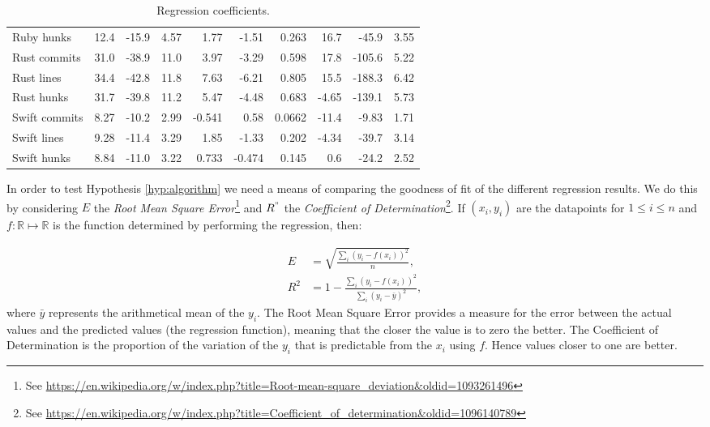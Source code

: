 \documentclass[10pt,journal,compsoc]{IEEEtran}
\begin{document}
\begin{table*}[t!]
\begin{center}
\begin{tabular}{l | *{3}{d{3.4}} | *{3}{d{3.4}} | d{4.5} *{2}{d{3.4}} }
Ruby hunks & 12.4 & -15.9 & 4.57 & 1.77 & -1.51 & 0.263 & 16.7 & -45.9 & 3.55 \\ \hdashline
Rust commits & 31.0 & -38.9 & 11.0 & 3.97 & -3.29 & 0.598 & 17.8 & -105.6 & 5.22 \\
Rust lines & 34.4 & -42.8 & 11.8 & 7.63 & -6.21 & 0.805 & 15.5 & -188.3 & 6.42 \\
Rust hunks & 31.7 & -39.8 & 11.2 & 5.47 & -4.48 & 0.683 & -4.65 & -139.1 & 5.73 \\ \hdashline
Swift commits & 8.27 & -10.2 & 2.99 & -0.541 & 0.58 & 0.0662 & -11.4 & -9.83 & 1.71 \\
Swift lines & 9.28 & -11.4 & 3.29 & 1.85 & -1.33 & 0.202 & -4.34 & -39.7 & 3.14 \\
Swift hunks & 8.84 & -11.0 & 3.22 & 0.733 & -0.474 & 0.145 & 0.6 & -24.2 & 2.52
\end{tabular}
\caption{\label{table:coefficients}Regression coefficients.}
\end{center}
\end{table*}

In order to test Hypothesis \ref{hyp:algorithm} we need a means of comparing the goodness of fit of the different regression results. We do this by considering $E$ the {\it Root Mean Square Error\/}\footnote{See \url{https://en.wikipedia.org/w/index.php?title=Root-mean-square_deviation&oldid=1093261496}} and $R^"$ the {\it Coefficient of Determination\/}\footnote{See \url{https://en.wikipedia.org/w/index.php?title=Coefficient_of_determination&oldid=1096140789}}. If $(x_i, y_i)$ are the datapoints for $1 \le i \le n$ and $f : \mathbb{R} \mapsto \mathbb{R}$ is the function determined by performing the regression, then:

\begin{align}
E   & = \sqrt{\frac{\sum_i (y_i - f(x_i))^2}{n}}, \\
R^2 & = 1 - \frac{\sum_i (y_i - f(x_i))^2}{\sum_i (y_i - \bar{y})^2},
\end{align}
where $\bar{y}$ represents the arithmetical mean of the $y_i$. The Root Mean Square Error provides a measure for the error between the actual values and the predicted values (the regression function), meaning that the closer the value is to zero the better. The Coefficient of Determination is the proportion of the variation of the $y_i$ that is predictable from the $x_i$ using $f$. Hence values closer to one are better.
\end{document}
